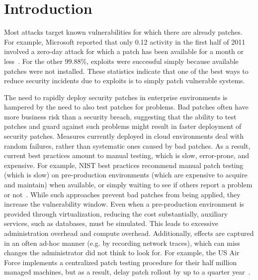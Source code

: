 \section{Introduction}
\label{tach:sec:intro}

Most attacks target known vulnerabilities for which there are already
patches.
For example, Microsoft reported that only 0.12%
activity in the first half of 2011 involved a zero-day attack for
which a patch has been available for a month or less~\cite{msir:2011}.
For the other 99.88\%,
exploits were successful simply because available patches were not
installed. 
These statistics indicate that one of the best ways to reduce
security incidents due to exploits is to simply patch vulnerable
systems.

The need to rapidly deploy security patches in enterprise environments
is hampered by the need to also test patches for problems. Bad patches
often have more business risk than a security breach, suggesting that
the ability to test patches and guard against such problems might
result in faster deployment of security patches. 
Measures currently deployed in cloud environments deal with random
failures, rather than systematic ones caused by bad patches.
As a result, current
best practices amount to manual testing, which is slow, error-prone,
and expensive. For example, NIST best practices recommend manual patch
testing (which is slow) on pre-production environments (which are
expensive to acquire and maintain) when available, or simply waiting
to see if others report a problem or  not~\cite{nistpatches:2005}.
While such approaches prevent bad patches from being applied, they
increase the vulnerability window.
Even when a pre-production environment is provided through virtualization, reducing the cost substantially,
auxiliary services, such as databases, must be simulated. This leads to excessive administration overhead and compute overhead.
Additionally, effects are captured
in an often ad-hoc manner (e.g. by recording network traces), which can miss changes the administrator did not think to look for.
 For example, the US Air Force
implements a centralized patch testing procedure for their half million
managed machines, but as a result, delay patch rollout by up to a
quarter year~\cite{afpatches:2007}.


